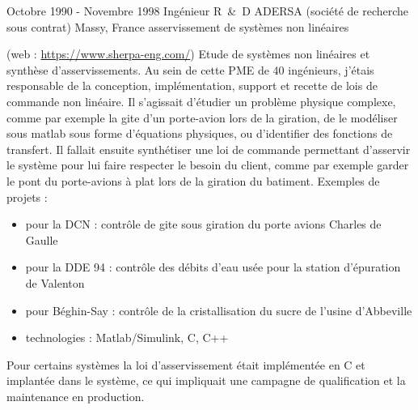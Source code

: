 
\item{
\cventry
{Octobre 1990 - Novembre 1998} %
{Ingénieur R~\&~D } %
{ADERSA (société de recherche sous contrat)} %
{Massy, France} %
{asservissement de systèmes non linéaires
}
{ 
(web : \href{https://www.sherpa-eng.com/}{https://www.sherpa-eng.com/})
Etude de systèmes non linéaires et synthèse d'asservissements.
\myvspace
Au sein de cette PME de 40 ingénieurs, j'étais responsable de la conception, implémentation, support et recette de lois de commande non linéaire. Il s'agissait d'étudier un problème physique complexe, comme par exemple la gite d'un porte-avion lors de la giration, de le modéliser sous matlab sous forme d'équations physiques, ou d'identifier des fonctions de transfert. Il fallait ensuite synthétiser une loi de commande permettant d'asservir le système pour lui faire respecter le besoin du client, comme par exemple garder le pont du porte-avions à plat lors de la giration du batiment.
Exemples de projets :
\begin{itemize}
\item {pour la DCN : contrôle de gite sous giration du porte avions Charles de Gaulle}
\item {pour la DDE 94 : contrôle des débits d'eau usée pour la station d'épuration de Valenton}
\item {pour Béghin-Say : contrôle de la cristallisation du sucre de l'usine d'Abbeville}
\item {technologies : Matlab/Simulink, C, C++}
\end{itemize}
\myvspace
Pour certains systèmes la loi d'asservissement était implémentée en C et implantée dans le système, ce qui impliquait une campagne de qualification et la maintenance en production.
} %
} %